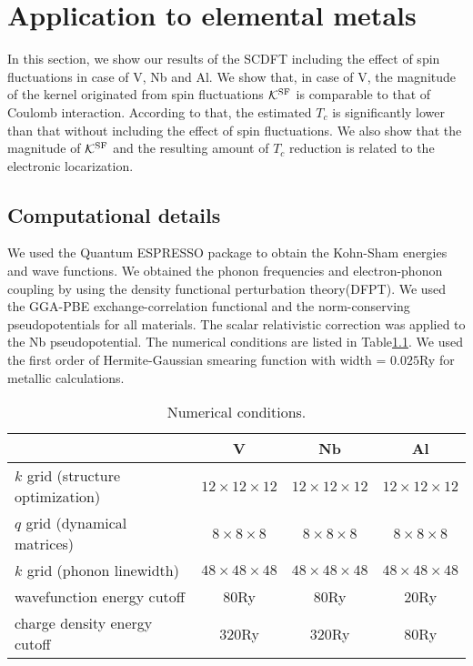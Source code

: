 

%
%
\chapter{Application to elemental metals}
In this section, we show our results of the SCDFT including the effect of spin fluctuations 
in case of V, Nb and Al. We show that, in case of V, the magnitude of the kernel originated 
from spin fluctuations $\mathcal K^{\rm SF}$ is comparable to that of Coulomb interaction.
According to that, the estimated $T_{c}$ is significantly lower than that without including the
effect of spin fluctuations. We also show that the magnitude of $\mathcal K^{\rm SF}$ and the 
resulting amount of $T_{c}$ reduction is related to the electronic locarization.

\section{Computational details}
We used the Quantum ESPRESSO\cite{QE} package to obtain the Kohn-Sham energies and wave functions.
We obtained the phonon frequencies and electron-phonon coupling by using the density functional
perturbation theory(DFPT)\cite{DFPT}.
We used the GGA-PBE exchange-correlation functional\cite{GGAPBE} and the norm-conserving 
pseudopotentials\cite{normcons} for all materials. 
The scalar relativistic correction was applied to the Nb pseudopotential.
The numerical conditions are listed in Table\ref{tab:numcond}.
We used the first order of Hermite-Gaussian smearing function\cite{Paxton1989} 
with width = $0.025$Ry for metallic calculations.

\begin{table}[hbtp]
	\centering
	\caption{Numerical conditions.}
	\begin{tabular}{lccc}
		\hline \hline
		& V & Nb & Al \\
		\hline
	$k$ grid (structure optimization) & $12\times12\times12$ & $12\times12\times12$ & $12\times12\times12$ \\
	$q$ grid (dynamical matrices) & $ 8\times8\times8$ & $8\times8\times8$ & $8\times8\times8$ \\
	$k$ grid (phonon linewidth) & $48\times48\times48$ & $48\times48\times48$ & $48\times48\times48$ \\
	wavefunction energy cutoff & 80Ry & 80Ry & 20Ry \\
	charge density energy cutoff & 320Ry & 320Ry & 80Ry \\
	\hline \hline
	\end{tabular}
	\label{tab:numcond}
\end{table}

